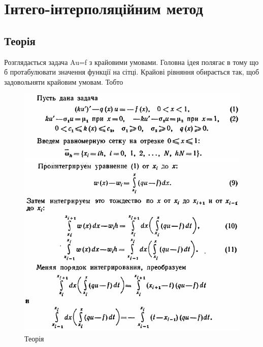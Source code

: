 \documentclass[fontsize=14pt,DIV=1,a4paper]{scrartcl}
\begin{document}
	\newpage
	\section{Iнтего-інтерполяційним метод}
	\subsection{Теорія}
	Розглядається задача Au=f з крайовими умовами. Головна ідея полягає в тому що б протабулювати значення функції на сітці. Крайові рівняння обирається так, щоб задовольняти крайовим умовам. Тобто
	\begin{figure}[h!]
		\includegraphics[scale=0.6]{iim_th1.png}
		\centering
		\caption{Теорія}
	\end{figure}
	
\end{document}
